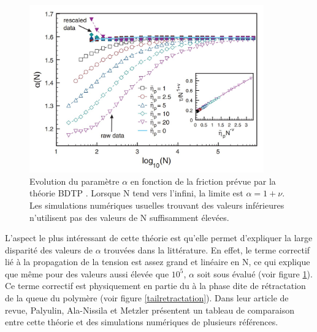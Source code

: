 \begin{figure}[H]
\begin{center}
\includegraphics[width=0.9\textwidth]{bdtpalpha.jpg}

\caption[Evolution de $\alpha$ selon la théorie BDTP]{Evolution du paramètre $\alpha$ en fonction de la friction prévue par la théorie BDTP \cite{Ikonen2013}. Lorsque N tend vers l'infini, la limite est $\alpha=1+\nu$. Les simulations numériques usuelles trouvant des valeurs inférieures n'utilisent pas des valeurs de N suffisamment élevées.}
\label{bdtp}
\end{center}
\end{figure}

L'aspect le plus intéressant de cette théorie est qu'elle permet d'expliquer la large disparité des valeurs de $\alpha$ trouvées dans la littérature. En effet, le terme correctif lié à la propagation de la tension est assez grand et linéaire en N, ce qui explique que même pour des valeurs aussi élevée que $10^5$, $\alpha$ soit sous évalué (voir figure \ref{bdtp}). Ce terme correctif est physiquement en partie du à la phase dite de rétractation de la queue du polymère (voir figure \ref{tailretractation}). Dans leur article de revue, Palyulin, Ala-Nissila et Metzler \cite{Palyulin2014} présentent un tableau de comparaison entre cette théorie et des simulations numériques de plusieurs références. 



